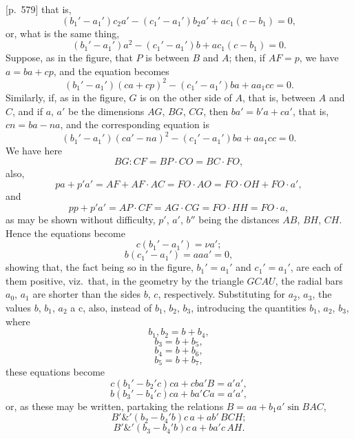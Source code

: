 \documentclass[11pt,a4paper]{book}
\begin{document}
[p.~579] that is,
\[
(b_1' - a_1') c_2 a' - (c_1' - a_1') b_2 a' + a c_1 (c - b_1) = 0,
\]
or, what is the same thing,
\[
(b_1' - a_1') a^2 - (c_1' - a_1') b + a c_1 (c - b_1) = 0.
\]
Suppose, as in the figure, that $P$ is between $B$ and $A$; then, if $AF = p$, we have $a = ba + cp$, and the equation becomes
\[
(b_1' - a_1') (ca + cp)^2 - (c_1' - a_1') b a + a a_1 c c = 0.
\]
Similarly, if, as in the figure, $G$ is on the other side of $A$, that is, between $A$ and $C$, and if $a$, $a'$ be the dimensions $AG$, $BG$, $CG$, then $b a' = b' a + c a'$, that is, $cn = ba - n a$, and the corresponding equation is
\[
(b_1' - a_1') (ca' - n a)^2 - (c_1' - a_1') b a + a a_1 c c = 0.
\]
We have here
\[
BG\colon CF = BP\cdot CO = BC\cdot FO,
\]
also,
\[
pa + p'a' = AF + AF\cdot AC = FO\cdot AO = FO\cdot OH + FO\cdot a',
\]
and
\[
pp + p'a' = AP\cdot CF = AG\cdot CG = FO\cdot HH = FO\cdot a,
\]
as may be shown without difficulty, $p'$, $a'$, $b''$ being the distances $AB$, $BH$, $CH$. Hence the equations become
\[
c(b_1' - a_1') = \nu a';
\]
\[
b(c_1' - a_1') = a a a' = 0,
\]
showing that, the fact being so in the figure, $b_1' = a_1'$ and $c_1' = a_1'$, are each of them positive, viz.\ that, in the geometry by the triangle $GCAU$, the radial bars $a_0$, $a_1$ are shorter than the sides $b$, $c$, respectively. Substituting for $a_2$, $a_3$, the values $b$, $b_1$, $a_2$ a c, also, instead of $b_1$, $b_2$, $b_3$, introducing the quantities $b_1$, $a_2$, $b_3$, where
\[
b_1, b_2 = b + b_4,
\]
\[
b_3 = b + b_5,
\]
\[
b_4 = b + b_6,
\]
\[
b_5 = b + b_7,
\]
these equations become
\[
c(b_1' - b_2'c) c a + cb a' B = a' a',
\]
\[
b(b_3' - b_4'c) c a + b a' C a = a' a',
\]
or, as these may be written, partaking the relations $B = a a + b_1 a' \sin BAC$,
\[
B'\&'(b_2 - b_4'b)c\, a + a b'\, BCH;
\]
\[
B'\&'(b_3 - b_4'b)c\, a + b a' c\, AH.
\]

\bigskip
\end{document}
